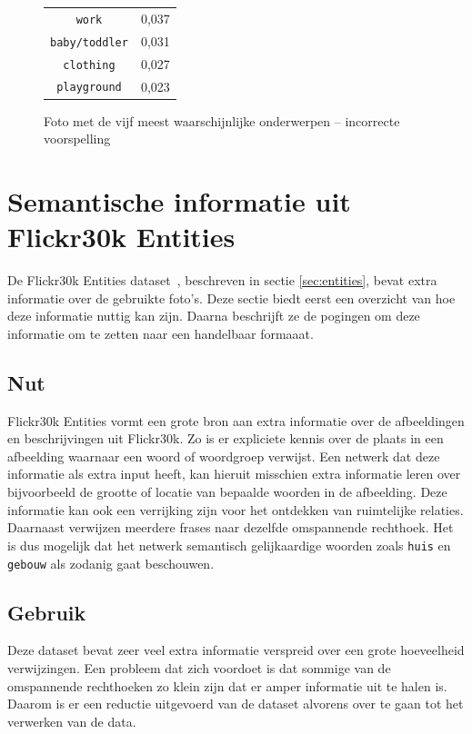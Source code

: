\begin{figure}[h]
\begin{minipage}[t]{.5\textwidth}
\begin{tabular}{cl}
            \texttt{work}                   & 0,037 \\
            \texttt{baby/toddler}                 & 0,031 \\
            \texttt{clothing}           & 0,027 \\
            \texttt{playground}        & 0,023\\
            \hline
        \end{tabular}
    \end{minipage}
    \caption{Foto met de vijf meest waarschijnlijke onderwerpen -- incorrecte voorspelling}
    \label{fig:wrongldalearning}
\end{figure}


\section{Semantische informatie uit Flickr30k Entities}
De Flickr30k Entities dataset~\cite{Plummer2015}, beschreven in sectie \ref{sec:entities}, bevat extra informatie over de gebruikte foto's. Deze sectie biedt eerst een overzicht van hoe deze informatie nuttig kan zijn. Daarna beschrijft ze de pogingen om deze informatie om te zetten naar een handelbaar formaaat.

\subsection{Nut}
Flickr30k Entities vormt een grote bron aan extra informatie over de afbeeldingen en beschrijvingen uit Flickr30k. Zo is er expliciete kennis over de plaats in een afbeelding waarnaar een woord of woordgroep verwijst. Een netwerk dat deze informatie als extra input heeft, kan hieruit misschien extra informatie leren over bijvoorbeeld de grootte of locatie van bepaalde woorden in de afbeelding. Deze informatie kan ook een verrijking zijn voor het ontdekken van ruimtelijke relaties. Daarnaast verwijzen meerdere frases naar dezelfde omspannende rechthoek. Het is dus mogelijk dat het netwerk semantisch gelijkaardige woorden zoals \texttt{huis} en \texttt{gebouw} als zodanig gaat beschouwen.


\subsection{Gebruik}
\label{sub:Gebruik}
Deze dataset bevat zeer veel extra informatie verspreid over een grote hoeveelheid verwijzingen. Een probleem dat zich voordoet is dat sommige van de omspannende rechthoeken zo klein zijn dat er amper informatie uit te halen is. Daarom is er een reductie uitgevoerd van de dataset alvorens over te gaan tot het verwerken van de data. 


